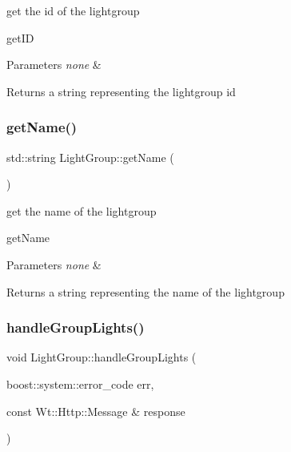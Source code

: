 get the id of the lightgroup 

get\+ID 
\begin{DoxyParams}{Parameters}
{\em none} & \\
\hline
\end{DoxyParams}
\begin{DoxyReturn}{Returns}
a string representing the lightgroup id 
\end{DoxyReturn}
\mbox{\label{class_light_group_a8bcdd2d8d6acfbdeac93c0708bddebf5}} 
\subsubsection{\texorpdfstring{get\+Name()}{getName()}}
{\footnotesize\ttfamily std\+::string Light\+Group\+::get\+Name (\begin{DoxyParamCaption}{ }\end{DoxyParamCaption})}



get the name of the lightgroup 

get\+Name 
\begin{DoxyParams}{Parameters}
{\em none} & \\
\hline
\end{DoxyParams}
\begin{DoxyReturn}{Returns}
a string representing the name of the lightgroup 
\end{DoxyReturn}
\mbox{\label{class_light_group_a69129340632df0060208a0715e65fe81}} 
\subsubsection{\texorpdfstring{handle\+Group\+Lights()}{handleGroupLights()}}
{\footnotesize\ttfamily void Light\+Group\+::handle\+Group\+Lights (\begin{DoxyParamCaption}\item[{boost\+::system\+::error\+\_\+code}]{err,  }\item[{const Wt\+::\+Http\+::\+Message \&}]{response }\end{DoxyParamCaption})\hspace{0.3cm}{\ttfamily [private]}}



